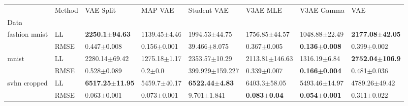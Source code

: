 \begin{tabular}{llllllll}
\toprule
             & Method &                   VAE-Split &           MAP-VAE &                Student-VAE &                 V3AE-MLE &                V3AE-Gamma &                         VAE \\
Data & {} &                             &                   &                            &                          &                           &                             \\
\midrule
fashion mnist & LL &   \textbf{2250.1$\pm$94.63} &  1139.45$\pm$4.46 &          1994.53$\pm$44.75 &        1756.85$\pm$44.57 &         1048.88$\pm$22.49 &  \textbf{2177.08$\pm$42.05} \\
             & RMSE &             0.447$\pm$0.008 &   0.156$\pm$0.001 &           39.466$\pm$8.075 &          0.367$\pm$0.005 &  \textbf{0.136$\pm$0.008} &             0.399$\pm$0.002 \\
mnist & LL &           2280.14$\pm$69.42 &  1275.18$\pm$1.17 &          2353.57$\pm$10.29 &       2113.81$\pm$146.63 &          1316.19$\pm$6.84 &  \textbf{2752.04$\pm$106.9} \\
             & RMSE &             0.528$\pm$0.089 &       0.2$\pm$0.0 &        399.929$\pm$159.227 &          0.339$\pm$0.007 &  \textbf{0.166$\pm$0.004} &             0.481$\pm$0.036 \\
svhn cropped & LL &  \textbf{6517.25$\pm$11.95} &  5459.7$\pm$40.17 &  \textbf{6522.44$\pm$4.83} &         6403.3$\pm$58.05 &         5493.46$\pm$14.97 &           4789.26$\pm$49.42 \\
             & RMSE &             0.063$\pm$0.001 &   0.073$\pm$0.001 &            9.701$\pm$1.841 &  \textbf{0.083$\pm$0.04} &  \textbf{0.054$\pm$0.001} &             0.311$\pm$0.022 \\
\bottomrule
\end{tabular}

